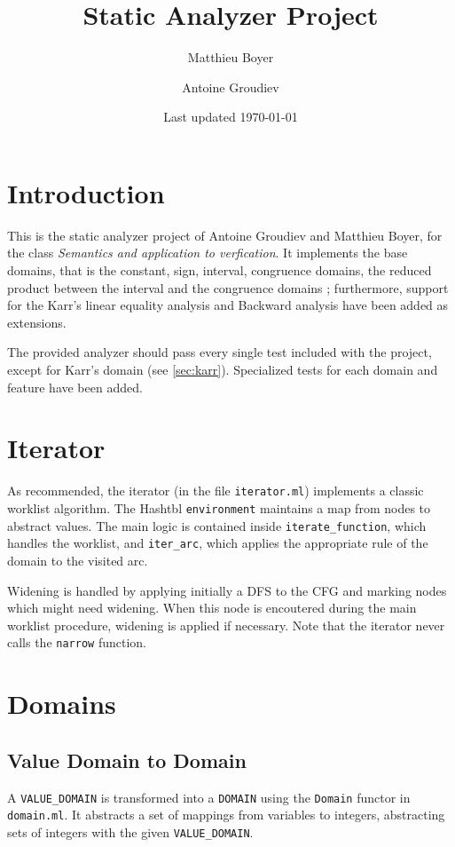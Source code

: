 \documentclass[12pt,a4paper]{article}
\title{\vspace{-5ex} \textbf{Static Analyzer Project}}
\author{Matthieu Boyer\and Antoine Groudiev}
\date{\vspace{-1ex}Last updated \today}
\begin{document}
\maketitle

\section*{Introduction}
This is the static analyzer project of Antoine Groudiev and Matthieu Boyer, for the class \emph{Semantics and application to verfication}. It implements the base domains, that is the constant, sign, interval, congruence domains, the reduced product between the interval and the congruence domains ; furthermore, support for the Karr’s linear equality analysis and Backward analysis have been added as extensions.

The provided analyzer should pass every single test included with the project, except for Karr's domain (see \ref{sec:karr}). Specialized tests for each domain and feature have been added.

\section{Iterator}
As recommended, the iterator (in the file \texttt{iterator.ml}) implements a classic worklist algorithm. The Hashtbl \texttt{environment} maintains a map from nodes to abstract values. The main logic is contained inside \texttt{iterate\_function}, which handles the worklist, and \texttt{iter\_arc}, which applies the appropriate rule of the domain to the visited arc. 

Widening is handled by applying initially a DFS to the CFG and marking nodes which might need widening. When this node is encoutered during the main worklist procedure, widening is applied if necessary. Note that the iterator never calls the \texttt{narrow} function.

\section{Domains}
\subsection{Value Domain to Domain}
A \texttt{VALUE\_DOMAIN} is transformed into a \texttt{DOMAIN} using the \texttt{Domain} functor in \texttt{domain.ml}. It abstracts a set of mappings from variables to integers, abstracting sets of integers with the given \texttt{VALUE\_DOMAIN}.
\end{document}
